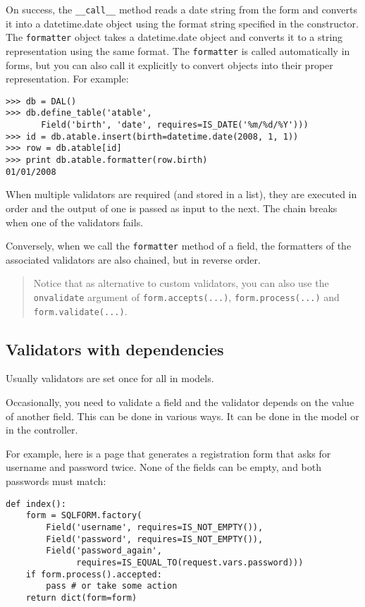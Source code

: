 \documentclass[justified,sixbynine,notoc]{tufte-book}
\def\ft{\small\tt}
\begin{document}
\begin{fullwidth}
On success, the {\ft \_\_call\_\_} method reads a date string from the form and converts it into a datetime.date object using the format string specified in the constructor. The {\ft formatter} object takes a datetime.date object and converts it to a string representation using the same format. The {\ft formatter} is called automatically in forms, but you can also call it explicitly to convert objects into their proper representation. For example:
\begin{lstlisting}
>>> db = DAL()
>>> db.define_table('atable',
       Field('birth', 'date', requires=IS_DATE('%m/%d/%Y')))
>>> id = db.atable.insert(birth=datetime.date(2008, 1, 1))
>>> row = db.atable[id]
>>> print db.atable.formatter(row.birth)
01/01/2008
\end{lstlisting}

When multiple validators are required (and stored in a list), they are executed in order and the output of one is passed as input to the next. The chain breaks when one of the validators fails.

Conversely, when we call the {\ft formatter} method of a field, the formatters of the associated validators are also chained, but in reverse order.

\begin{quote}Notice that as alternative to custom validators, you can also use the {\ft onvalidate} argument of {\ft form.accepts(...)}, {\ft form.process(...)} and {\ft form.validate(...)}.\end{quote}
\goodbreak\subsection{Validators with dependencies}

Usually validators are set once for all in models.

Occasionally, you need to validate a field and the validator depends on the value of another field. This can be done in various ways. It can be done in the model or in the controller.

For example, here is a page that generates a registration form that asks for username and password twice. None of the fields can be empty, and both passwords must match:
\begin{lstlisting}
def index():
    form = SQLFORM.factory(
        Field('username', requires=IS_NOT_EMPTY()),
        Field('password', requires=IS_NOT_EMPTY()),
        Field('password_again',
              requires=IS_EQUAL_TO(request.vars.password)))
    if form.process().accepted:
        pass # or take some action
    return dict(form=form)
\end{lstlisting}


\end{fullwidth}
\end{document}
